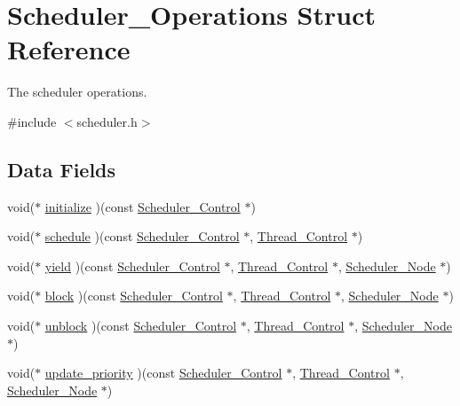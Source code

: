 \hypertarget{structScheduler__Operations}{}\section{Scheduler\+\_\+\+Operations Struct Reference}
\label{structScheduler__Operations}


The scheduler operations.  




{\ttfamily \#include $<$scheduler.\+h$>$}

\subsection*{Data Fields}
\begin{DoxyCompactItemize}
\item 
void($\ast$ \mbox{\hyperlink{structScheduler__Operations_aae7916959595359dc4de3899dcd5d641}{initialize}} )(const \mbox{\hyperlink{struct__Scheduler__Control}{Scheduler\+\_\+\+Control}} $\ast$)
\item 
void($\ast$ \mbox{\hyperlink{structScheduler__Operations_aff5c491f2a2da3c2c02b2aa3933579de}{schedule}} )(const \mbox{\hyperlink{struct__Scheduler__Control}{Scheduler\+\_\+\+Control}} $\ast$, \mbox{\hyperlink{struct__Thread__Control}{Thread\+\_\+\+Control}} $\ast$)
\item 
void($\ast$ \mbox{\hyperlink{structScheduler__Operations_ad2496c11920c57d1ec323f0d1bd79977}{yield}} )(const \mbox{\hyperlink{struct__Scheduler__Control}{Scheduler\+\_\+\+Control}} $\ast$, \mbox{\hyperlink{struct__Thread__Control}{Thread\+\_\+\+Control}} $\ast$, \mbox{\hyperlink{structScheduler__Node}{Scheduler\+\_\+\+Node}} $\ast$)
\item 
void($\ast$ \mbox{\hyperlink{structScheduler__Operations_ae34999aba57729811328c817f0ae7e43}{block}} )(const \mbox{\hyperlink{struct__Scheduler__Control}{Scheduler\+\_\+\+Control}} $\ast$, \mbox{\hyperlink{struct__Thread__Control}{Thread\+\_\+\+Control}} $\ast$, \mbox{\hyperlink{structScheduler__Node}{Scheduler\+\_\+\+Node}} $\ast$)
\item 
void($\ast$ \mbox{\hyperlink{structScheduler__Operations_a2e40ae42cf47217bb7ac159a23a3eac6}{unblock}} )(const \mbox{\hyperlink{struct__Scheduler__Control}{Scheduler\+\_\+\+Control}} $\ast$, \mbox{\hyperlink{struct__Thread__Control}{Thread\+\_\+\+Control}} $\ast$, \mbox{\hyperlink{structScheduler__Node}{Scheduler\+\_\+\+Node}} $\ast$)
\item 
void($\ast$ \mbox{\hyperlink{structScheduler__Operations_a2a15895ba197e2a417a367ad329f33fe}{update\+\_\+priority}} )(const \mbox{\hyperlink{struct__Scheduler__Control}{Scheduler\+\_\+\+Control}} $\ast$, \mbox{\hyperlink{struct__Thread__Control}{Thread\+\_\+\+Control}} $\ast$, \mbox{\hyperlink{structScheduler__Node}{Scheduler\+\_\+\+Node}} $\ast$)

\end{DoxyCompactItemize}
